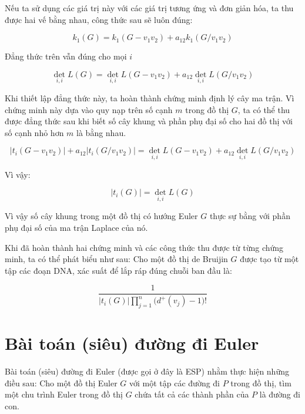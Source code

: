 \documentclass[14pt, a4paper]{article}
\numberwithin{equation}{section}
\numberwithin{figure}{section}
\numberwithin{dl}{section}
\numberwithin{md}{section}
\numberwithin{bd}{section}
\numberwithin{dn}{section}
\numberwithin{hq}{section}
\begin{document}
    Nếu ta sử dụng các giá trị này với các giá trị tương ứng và đơn giản hóa, ta thu được hai vế bằng nhau, công thức sau sẽ luôn đúng:

    \begin{equation}
        k_1 (G) = k_1 (G - v_1 v_2) + a_{12} k_1 (G / v_1 v_2)
    \end{equation}

    Đẳng thức trên vẫn đúng cho mọi $i$

    \begin{equation}
        \det_{i,i} L(G) = \det_{i, i} L (G - v_1 v_2) + a_{12} \det_{i, i} L (G/ v_1 v_2)
    \end{equation}

    Khi thiết lập đẳng thức này, ta hoàn thành chứng minh định lý cây ma trận.
    Vì chứng minh này dựa vào quy nạp trên số cạnh $m$ trong đồ thị $G$, ta có thể thu được đẳng thức sau khi biết số cây khung và phần phụ đại số cho hai đồ thị với số cạnh nhỏ hơn $m$ là bằng nhau.

    \begin{equation}
        \lvert t_i (G - v_1 v_2) \rvert + a_{12} \lvert t_i (G / v_1 v_2) \rvert = \det_{i, i} L(G - v_1 v_2) + a_{12} \det_{i, i} L (G / v_1 v_2)
    \end{equation}

    Vì vậy:

    \begin{equation}
        \lvert t_i (G) \rvert = \det_{i, i} L(G)
    \end{equation}

    Vì vậy số cây khung trong một đồ thị có hướng Euler $G$ thực sự bằng với phần phụ đại số của ma trận Laplace của nó.

    Khi đã hoàn thành hai chứng minh và các công thức thu được từ từng chứng minh, ta có thể phát biểu như sau:
    Cho một đồ thị de Bruijin $G$ được tạo từ một tập các đoạn DNA, xác suất để lắp ráp đúng chuỗi ban đầu là:

    \begin{equation}
        \dfrac{1}{\lvert t_i(G) \rvert \prod_{j=1}^n \big( d^+ (v_j) - 1 \big)!}
    \end{equation}

    \section{Bài toán (siêu) đường đi Euler}

    Bài toán (siêu) đường đi Euler (được gọi ở đây là ESP) nhằm thực hiện những điều sau:
    Cho một đồ thị Euler $G$ với một tập các đường đi $P$ trong đồ thị, tìm một chu trình Euler trong đồ thị $G$ chứa tất cả các thành phần của $P$ là đường đi con.
\end{document}
